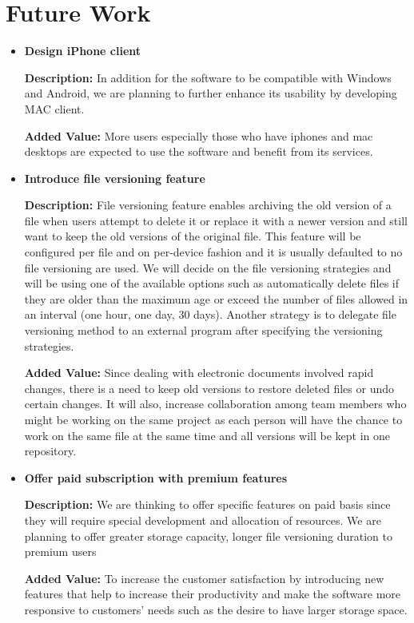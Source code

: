 \documentclass{article}
\begin{document}
\section{Future Work}
\begin{itemize}

\item \textbf{Design iPhone client}

\textbf{Description:} In addition for the software to be compatible with Windows and Android, we are planning to further enhance its usability by developing MAC client.

\textbf{Added Value:} More users especially those who have iphones and mac desktops are expected to use the software and benefit from its services.
\item \textbf{Introduce file versioning feature}

\textbf{Description:} File versioning feature enables archiving the old version of a file when users attempt to delete it or replace it with a newer version and still want to keep the old versions of the original file. This feature will be configured per file and on per-device fashion and it is usually defaulted to no file versioning are used.
We will decide on the file versioning strategies and will be using one of the available options such as automatically delete files if they are older than the maximum age or exceed the number of files allowed in an interval (one hour, one day, 30 days). Another strategy is to delegate file versioning method to an external program after specifying the versioning strategies.

\textbf{Added Value:} Since dealing with electronic documents involved rapid changes, there is a need to keep old versions to restore deleted files or undo certain changes. It will also, increase collaboration among team members who might be working on the same project as each person will have the chance to work on the same file at the same time and all versions will be kept in one repository.

\item \textbf{Offer paid subscription with premium features}

\textbf{Description:} We are thinking to offer specific features on paid basis since they will require special development and allocation of resources. We are planning to offer greater storage capacity, longer file versioning duration to premium users

\textbf{Added Value:} To increase the customer satisfaction by introducing new features that help to increase their productivity and make the software more responsive to customers’ needs such as the desire to have larger storage space.


\end{itemize}
\end{document}
